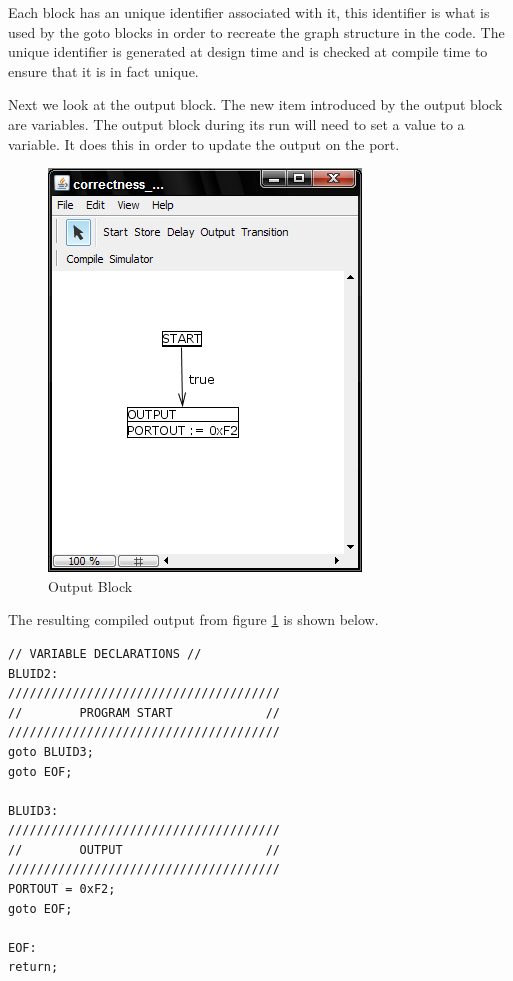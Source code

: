 Each block has an unique identifier associated with it, this identifier is what is used by the goto blocks in order to recreate the graph structure in the code. The unique identifier is generated at design time and is checked at compile time to ensure that it is in fact unique.

Next we look at the output block. The new item introduced by the output block are variables. The output block during its run will need to set a value to a variable. It does this in order to update the output on the port. 

\begin{figure}[htb]
	\centering
	\includegraphics[width=\imgmedphoto]{./images/correctness_ex_output.png}
	\caption{Output Block}
	\label{fig:correctness_ex_output}
\end{figure}

The resulting compiled output from figure \ref{fig:correctness_ex_output} is shown below.

\begin{minipage}{\textwidth}
\begin{lstlisting}[frame=single]
// VARIABLE DECLARATIONS //
BLUID2:
//////////////////////////////////////
//        PROGRAM START             //
//////////////////////////////////////
goto BLUID3;
goto EOF;

BLUID3:
//////////////////////////////////////
//        OUTPUT                    //
//////////////////////////////////////
PORTOUT = 0xF2;
goto EOF;

EOF:
return;
\end{lstlisting}
\end{minipage}

